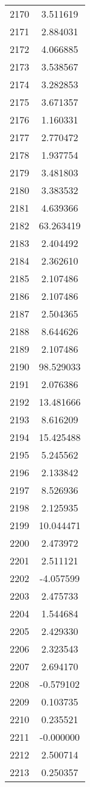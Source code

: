 \documentclass[12pt]{article}
\begin{document}
\begin{longtable}{@{}cc@{}}
2170 & 3.511619 \\
2171 & 2.884031 \\
2172 & 4.066885 \\
2173 & 3.538567 \\
2174 & 3.282853 \\
2175 & 3.671357 \\
2176 & 1.160331 \\
2177 & 2.770472 \\
2178 & 1.937754 \\
2179 & 3.481803 \\
2180 & 3.383532 \\
2181 & 4.639366 \\
2182 & 63.263419 \\
2183 & 2.404492 \\
2184 & 2.362610 \\
2185 & 2.107486 \\
2186 & 2.107486 \\
2187 & 2.504365 \\
2188 & 8.644626 \\
2189 & 2.107486 \\
2190 & 98.529033 \\
2191 & 2.076386 \\
2192 & 13.481666 \\
2193 & 8.616209 \\
2194 & 15.425488 \\
2195 & 5.245562 \\
2196 & 2.133842 \\
2197 & 8.526936 \\
2198 & 2.125935 \\
2199 & 10.044471 \\
2200 & 2.473972 \\
2201 & 2.511121 \\
2202 & -4.057599 \\
2203 & 2.475733 \\
2204 & 1.544684 \\
2205 & 2.429330 \\
2206 & 2.323543 \\
2207 & 2.694170 \\
2208 & -0.579102 \\
2209 & 0.103735 \\
2210 & 0.235521 \\
2211 & -0.000000 \\
2212 & 2.500714 \\
2213 & 0.250357 \\

\end{longtable}
\end{document}

